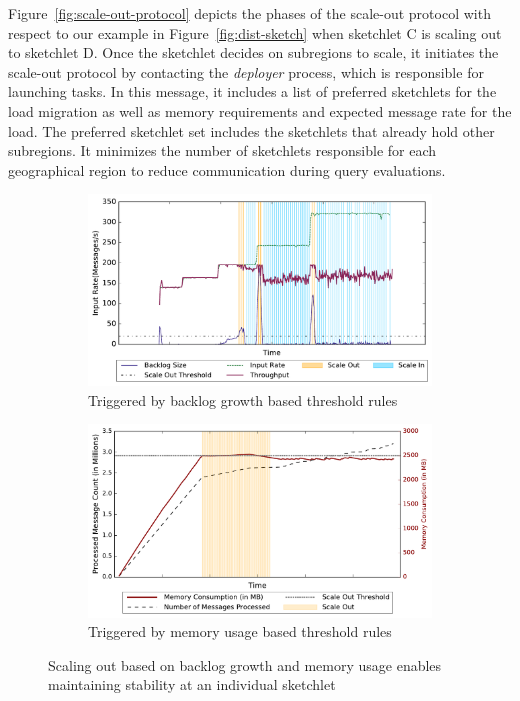 Figure~\ref{fig:scale-out-protocol} depicts the phases of the scale-out protocol with respect to our example in Figure~\ref{fig:dist-sketch} when sketchlet C is scaling out to sketchlet D.
Once the sketchlet decides on subregions to scale, it initiates the scale-out protocol by contacting the \emph{deployer} process, which is responsible for launching tasks.
In this message, it includes a list of preferred sketchlets for the load migration as well as memory requirements and expected message rate for the load.
The preferred sketchlet set includes the sketchlets that already hold other subregions.
It minimizes the number of sketchlets responsible for each geographical region to reduce communication during query evaluations.
\begin{figure}[h!]
    \begin{subfigure}{0.48\textwidth}
            \centering
            \includegraphics[scale=0.42]{figures/stability_partial.pdf}
            \caption{Triggered by backlog growth based threshold rules}
            \label{fig:stability-backlog}
    \end{subfigure}
    \begin{subfigure}{0.48\textwidth}
            \centering
            \includegraphics[scale=0.42]{figures//mem_stability.pdf} 
            \caption{Triggered by memory usage based threshold rules}
            \label{fig:stability-mem}
    \end{subfigure}
    \caption{Scaling out based on backlog growth and memory usage enables maintaining stability at an individual sketchlet}
    \label{fig:system-stability}
\end{figure}
